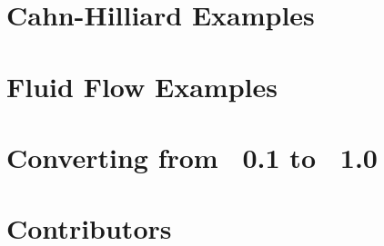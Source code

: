 \documentclass[letterpaper,twoside,openright,10pt]{memoir}
\begin{document}





\chapter{Cahn-Hilliard Examples}



\chapter{Fluid Flow Examples}



\chapter{Converting from \FiPy{}~0.1 to \FiPy{}~1.0}
\label{chap:Update0.1to1.0}




\backmatter


\fussy

% 



\sloppy
\raggedright
\printindex

\fussy

\appendix 


\chapter*{Contributors}
\label{chap:Contributors}



\end{document}

